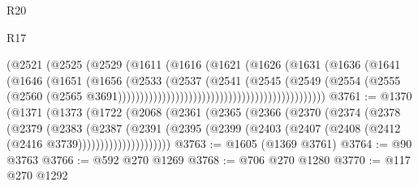\begin{lexlean}{R20}
\begin{lexlean}{R17}
\begin{coremodule}
{{{{{{{{{{{{{{{{{{{{{{{{{{{{{{{{{{{{{{{{{{{{{{{{{{{{{{{{{{{{{{{{{{{{{{{{{{{{{{{{{{{{{{{{{{{{{{{{{{{{{{{{{{{                                                      (@2521
                                                        (@2525
                                                          (@2529
                                                            (@1611
                                                              (@1616
                                                                (@1621
                                                                  (@1626
                                                                    (@1631
                                                                      (@1636
                                                                        (@1641
                                                                          (@1646
                                                                            (@1651
                                                                              (@1656
                                                                                (@2533
                                                                                  (@2537
                                                                                    (@2541
                                                                                      (@2545
                                                                                        (@2549
                                                                                          (@2554
                                                                                            (@2555
                                                                                              (@2560
                                                                                                (@2565
                                                                                                  @3691)))))))))))))))))))))))))))))))))))))))))))))))
@3761 := @1370
    (@1371
      (@1373
        (@1722
          (@2068
            (@2361
              (@2365
                (@2366
                  (@2370
                    (@2374
                      (@2378
                        (@2379
                          (@2383
                            (@2387
                              (@2391
                                (@2395
                                  (@2399
                                    (@2403 (@2407 (@2408 (@2412 (@2416 @3739)))))))))))))))))))))
@3763 := @1605 (@1369 @3761)
@3764 := @90 @3763
@3766 := @592 @270 @1269
@3768 := @706 @270 @1280
@3770 := @117 @270 @1292
}}}}}}}}}}}}}}}}}}}}}}}}}}}}}}}}}}}}}}}}}}}}}}}}}}}}}}}}}}}}}}}}}}}}}}}}}}}}}}}}}}}}}}}}}}}}}}}}}}}}}}}}}}}
\end{coremodule}
\end{lexlean}
\end{lexlean}
